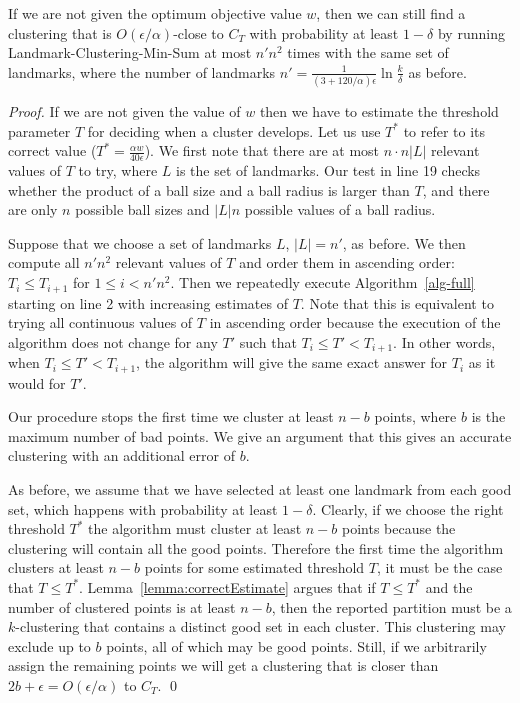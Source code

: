 \documentclass{llncs} \usepackage{algorithm}
\begin{document}
\begin{theorem}\label{lemma:unknownW}
If we are not given the optimum objective value $w$, then we can still find a clustering that is $O(\epsilon/\alpha)$-close to $C_{T}$ with probability at least $1-\delta$ by running Landmark-Clustering-Min-Sum at most $n'n^2$ times with the same set of landmarks, where the number of landmarks $n' = \frac{1}{(3+120/\alpha)\epsilon} \ln \frac{k}{\delta}$ as before.
\end{theorem}

\begin{proof}

If we are not given the value of $w$ then we have to estimate the threshold parameter $T$ for deciding when a cluster develops.  Let us use $T^{\ast}$ to refer to its correct value ($T^{\ast} = \frac{\alpha w}{40 \epsilon}$).  We first note that there are at most $n \cdot n \vert L \vert$ relevant values of $T$ to try, where $L$ is the set of landmarks.  Our test in line 19 checks whether the product of a ball size and a ball radius is larger than $T$, and there are only $n$ possible ball sizes and $\vert L \vert n$ possible values of a ball radius.

Suppose that we choose a set of landmarks $L$, $\vert L \vert = n'$, as before. We then compute all $n' n^2$ relevant values of $T$ and order them in ascending order: $T_{i} \le T_{i+1}$ for $1 \le i < n' n^2$.  Then we repeatedly execute Algorithm~\ref{alg-full} starting on line 2 with increasing estimates of $T$.  Note that this is equivalent to trying all continuous values of $T$ in ascending order because the execution of the algorithm does not change for any $T'$ such that $T_{i} \le T' < T_{i+1}$.  In other words, when $T_{i} \le T' < T_{i+1}$, the algorithm will give the same exact answer for $T_{i}$ as it would for $T'$.

Our procedure stops the first time we cluster at least $n-b$ points, where $b$ is the maximum number of bad points.  We give an argument that this gives an accurate clustering with an additional error of $b$.

As before, we assume that we have selected at least one landmark from each good set, which happens with probability at least $1-\delta$.  Clearly, if we choose the right threshold $T^{\ast}$ the algorithm must cluster at least $n-b$ points because the clustering will contain all the good points.  Therefore the first time the algorithm clusters at least $n-b$ points for some estimated threshold $T$, it must be the case that $T \le T^{\ast}$.  Lemma~\ref{lemma:correctEstimate} argues that if $T \le T^{\ast}$ and the number of clustered points is at least $n-b$, then the reported partition must be a $k$-clustering that contains a distinct good set in each cluster.  This clustering may exclude up to $b$ points, all of which may be good points.  Still, if we arbitrarily assign the remaining points we will get a clustering that is closer than $2b + \epsilon = O(\epsilon / \alpha)$ to $C_{T}$. \qed

\end{proof}
\end{document}
